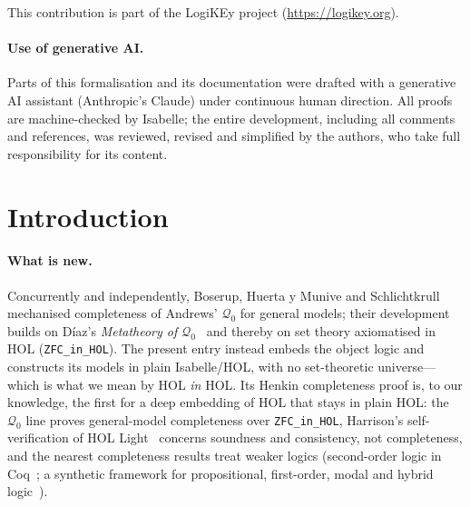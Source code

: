 \documentclass[11pt,a4paper]{article}
\begin{document}
\begin{abstract}
As an illustration, Cantor's theorem is derived \emph{inside}
$\mathrm{NK}$, in surjective and injective form and at every
type~\cite{SEPChurchTT}.  Finally, two senses of infinity are compared: infinity as a
semantic property of the individual domain, axiomatised by first-order
sentences, and infinity as a single syntactic axiom.  The
constant-free first-order sentences ``there are at least $n$
individuals''---the axiomatisation of ``the domain is infinite'' in the
language of equality~\cite[III.6.3]{EFT21}---are consistent with $\mathrm{NK}$, by
compactness over arbitrarily large finite models: the consistency proof
constructs no infinite model.  The single Dedekind-style axiom of
infinity derives each of these sentences, but they do not derive the
axiom: no finite part of them does, and a Henkin model of them all,
countable over a countable signature, refutes it.
\end{abstract}

\medskip\noindent
This contribution is part of the LogiKEy project
(\url{https://logikey.org}).

\paragraph{Use of generative AI.}
Parts of this formalisation and its documentation were drafted with a
generative AI assistant (Anthropic's Claude) under continuous human
direction.  All proofs are machine-checked by Isabelle; the entire
development, including all comments and references, was reviewed, revised
and simplified by the authors, who take full responsibility for its content.

\setcounter{tocdepth}{1}
\tableofcontents
\newpage

\section{Introduction}

\paragraph{What is new.}
Concurrently and independently, Boserup, Huerta y Munive and
Schlichtkrull~\cite{Q0CompletenessAFP} mechanised completeness of
Andrews' $\mathcal{Q}_0$ for general models; their development builds on
D\'iaz's \emph{Metatheory of $\mathcal{Q}_0$}~\cite{Q0MetatheoryAFP} and
thereby on set theory axiomatised in HOL (\texttt{ZFC\_in\_HOL}).  The
present entry instead embeds the object logic and constructs its models
in plain Isabelle/HOL, with no set-theoretic universe---which is what
we mean by HOL \emph{in} HOL.  Its Henkin completeness proof is, to our knowledge, the first for a
deep embedding of HOL that stays in plain HOL: the $\mathcal{Q}_0$ line
proves general-model completeness over \texttt{ZFC\_in\_HOL},
Harrison's self-verification of HOL Light~\cite{Harrison06}
concerns soundness and consistency, not completeness, and the nearest
completeness results treat weaker logics (second-order logic in
Coq~\cite{KochKirst22}; a synthetic framework for propositional,
first-order, modal and hybrid logic~\cite{From25}).
\end{document}

